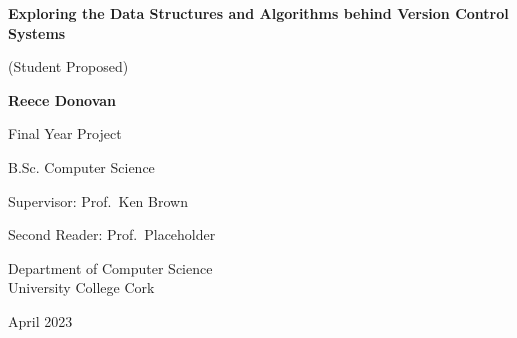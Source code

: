 \documentclass[12pt]{report}
\begin{document}

\begin{titlepage}
  \begin{center}
    \vspace*{\fill}

    \textbf{\LARGE{Exploring the Data Structures and Algorithms behind Version Control Systems}}

    \medskip
    \large{(Student Proposed)}

    \vspace{1.3cm}
    \textbf{\Large{Reece Donovan}}

    \vspace{1.3cm}
    \large{Final Year Project}

    \large{B.Sc. Computer Science}

    \vspace{1.4cm}
    \large{Supervisor: Prof.\ Ken Brown}

    \large{Second Reader: Prof.\ Placeholder}

    \vspace{1.45cm}

    \normalsize{Department of Computer Science}\\
    \normalsize{University College Cork}

    \vspace{1.5cm}
    \large{April 2023}

    \vspace*{\fill}
  \end{center}
\end{titlepage}

% 

\newpage
% 

\newpage
% 

\tableofcontents
\newpage
{}
% 

\newpage
% 

\newpage
% 

\newpage
% 

\newpage
% 

\newpage
% 

\newpage
\end{document}
